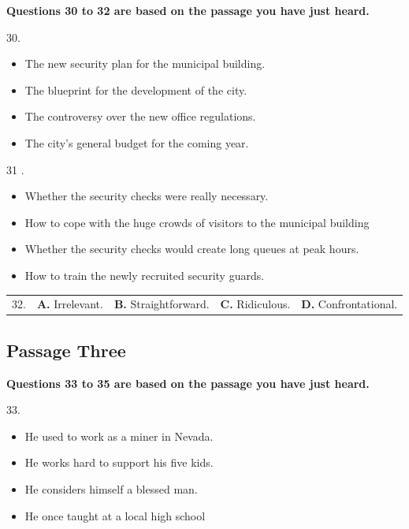 \documentclass[UTF8,11pt]{ctexart}
\begin{document}
\textbf{Questions 30 to 32 are based on the passage you have just heard.}


30.


\begin{itemize}[leftmargin=2em,itemsep=.2em,topsep=.4em]\item[A.] The new security plan for the municipal building.
\item[B.] The blueprint for the development of the city.
\item[C.] The controversy over the new office regulations.
\item[D.] The city's general budget for the coming year.
\end{itemize}

31 .


\begin{itemize}[leftmargin=2em,itemsep=.2em,topsep=.4em]\item[A.] Whether the security checks were really necessary.
\item[B.] How to cope with the huge crowds of visitors to the municipal building
\item[C.] Whether the security checks would create long queues at peak hours.
\item[D.] How to train the newly recruited security guards.
\end{itemize}

\noindent\begin{tabularx}{\linewidth}{@{}lXXXX@{}}32. & \textbf{A.} Irrelevant. & \textbf{B.} Straightforward. & \textbf{C.} Ridiculous. & \textbf{D.} Confrontational.\\\end{tabularx}\par

\subsection*{\textbf{Passage Three}}


\textbf{Questions 33 to 35 are based on the passage you have just heard.}


33.


\begin{itemize}[leftmargin=2em,itemsep=.2em,topsep=.4em]\item[A.] He used to work as a miner in Nevada.
\item[B.] He works hard to support his five kids.
\item[C.] He considers himself a blessed man.
\item[D.] He once taught at a local high school
\end{itemize}
\end{document}
